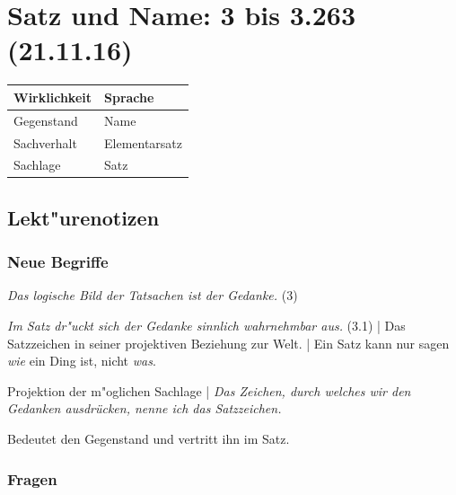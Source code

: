\documentclass[emulatestandardclasses]{scrartcl}
\begin{document}
\section{Satz und Name: 3 bis 3.263\\(21.11.16)}

\begin{center}
    \begin{tabular}{  l | l }
    \textbf{Wirklichkeit} & \textbf{Sprache}\\ \hline
    Gegenstand & Name \\ 
    Sachverhalt & Elementarsatz \\
    Sachlage & Satz \\
    \end{tabular}
\end{center}



\subsection{Lekt"urenotizen}

\vspace{10pt}
\subsubsection{Neue Begriffe}

\begin{description}[leftmargin=!,labelwidth=\widthof{\bfseries Satzzeichen}]
  \item[Gedanke] \emph{Das logische Bild der Tatsachen ist der Gedanke.} (3)
  \item[Satz] \emph{Im Satz dr"uckt sich der Gedanke sinnlich wahrnehmbar aus.} (3.1) | Das Satzzeichen in seiner projektiven Beziehung zur Welt. | Ein Satz kann nur sagen \emph{wie} ein Ding ist, nicht \emph{was}.
  \item[Satzzeichen] Projektion der m"oglichen Sachlage | \emph{Das Zeichen, durch welches wir den Gedanken ausdrücken, nenne ich das Satzzeichen.}
  \item[Name] Bedeutet den Gegenstand und vertritt ihn im Satz.
  \item[Urzeichen]
  \item[Anwendung]
\end{description}

\subsubsection{Fragen}
\end{document}
